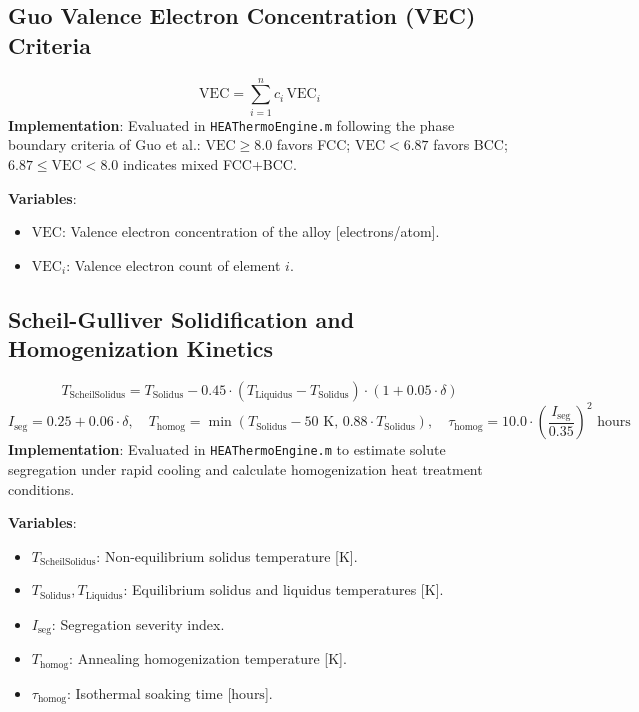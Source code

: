 \documentclass[11pt,a4paper]{article}
\begin{document}
\subsection{Guo Valence Electron Concentration (VEC) Criteria}
\begin{equation}
\text{VEC} = \sum_{i=1}^n c_i \, \text{VEC}_i
\end{equation}
\textbf{Implementation}: Evaluated in \texttt{HEAThermoEngine.m} following the phase boundary criteria of Guo et al.: $\text{VEC} \ge 8.0$ favors FCC; $\text{VEC} < 6.87$ favors BCC; $6.87 \le \text{VEC} < 8.0$ indicates mixed FCC+BCC.

\noindent\textbf{Variables}:
\begin{itemize}
  \item $\text{VEC}$: Valence electron concentration of the alloy [electrons/atom].
  \item $\text{VEC}_i$: Valence electron count of element $i$.
\end{itemize}

\subsection{Scheil-Gulliver Solidification and Homogenization Kinetics}
\begin{equation}
T_{\text{ScheilSolidus}} = T_{\text{Solidus}} - 0.45 \cdot (T_{\text{Liquidus}} - T_{\text{Solidus}}) \cdot (1 + 0.05 \cdot \delta)
\end{equation}
\begin{equation}
I_{\text{seg}} = 0.25 + 0.06 \cdot \delta, \quad T_{\text{homog}} = \min(T_{\text{Solidus}} - 50 \text{ K}, \, 0.88 \cdot T_{\text{Solidus}}), \quad \tau_{\text{homog}} = 10.0 \cdot \left(\frac{I_{\text{seg}}}{0.35}\right)^2 \text{ hours}
\end{equation}
\textbf{Implementation}: Evaluated in \texttt{HEAThermoEngine.m} to estimate solute segregation under rapid cooling and calculate homogenization heat treatment conditions.

\noindent\textbf{Variables}:
\begin{itemize}
  \item $T_{\text{ScheilSolidus}}$: Non-equilibrium solidus temperature [$\text{K}$].
  \item $T_{\text{Solidus}}, T_{\text{Liquidus}}$: Equilibrium solidus and liquidus temperatures [$\text{K}$].
  \item $I_{\text{seg}}$: Segregation severity index.
  \item $T_{\text{homog}}$: Annealing homogenization temperature [$\text{K}$].
  \item $\tau_{\text{homog}}$: Isothermal soaking time [$\text{hours}$].
\end{itemize}
\end{document}
